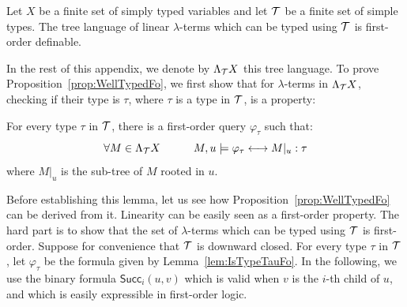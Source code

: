 \begin{proposition}\label{prop:WellTypedFo}
   Let $X$ be a finite set of simply typed variables and let ${\mathcal T}$ be a finite set of simple types.      The tree language of linear $\lambda$-terms which can be typed
using ${\mathcal T}$ is first-order definable. 
\end{proposition}

In the rest of this appendix, we denote by $\Lambda_{{\mathcal T}} X$ this tree language.
To prove Proposition~\ref{prop:WellTypedFo}, we first show that for $\lambda$-terms in $\Lambda_{{\mathcal T}} X$, checking if their type is $\tau$, where $\tau$ is a type in ${\mathcal T}$, is a \fo property:
\begin{lemma}\label{lem:IsTypeTauFo}
For every type $\tau$ in ${\mathcal T}$, there is a first-order query $\varphi_\tau$ such that:
$$ \forall M\in \Lambda_{{\mathcal T}} X \qquad\quad M,u \models \varphi_\tau \longleftrightarrow M|_u:\tau$$
where $M|_u$ is the sub-tree of $M$ rooted in $u$. 
\end{lemma}
Before establishing this lemma, let us see how Proposition~\ref{prop:WellTypedFo} can be derived from it. Linearity can be easily seen as a first-order property. The hard part is to show that the set of $\lambda$-terms which can be typed using ${\mathcal T}$ is first-order. Suppose for convenience that ${\mathcal T}$ is downward closed. For every type $\tau$ in ${\mathcal T}$, let $\varphi_\tau$ be the formula given by Lemma~\ref{lem:IsTypeTauFo}. In the following, we use the binary formula
 $\mathsf{Succ}_{i}(u,v)$ which is valid when $v$ is the $i$-th child of $u$, and which is easily expressible in first-order logic.
 \smallskip
 
